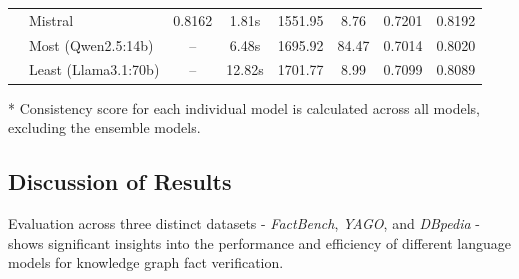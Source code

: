 \begin{table}[ht!]
{\begin{threeparttable}
\begin{tabular}{llcccc||cc}
                                            & Mistral                            & 0.8162                         & 1.81s                            & 1551.95                                       & 8.76             & 0.7201    & 0.8192   \\ \cline{2-8}
                                            & Most (Qwen2.5:14b)                 & --                             & 6.48s                            & 1695.92                                       & 84.47            & 0.7014    & 0.8020   \\
                                            & Least (Llama3.1:70b)               & --                             & 12.82s                           & 1701.77                                       & 8.99             & 0.7099    & 0.8089   \\
                \bottomrule
            \end{tabular}
            \begin{tablenotes}
                \item[*] Consistency score for each individual model is calculated across all models, excluding the ensemble models.
            \end{tablenotes}
        \end{threeparttable}}
    \label{tab:evaluation_results-full-wo-category-all-datasets}
\end{table}

\subsection{Discussion of Results}\label{subsec:discussion-of-results}
Evaluation across three distinct datasets - \textit{FactBench}, \textit{YAGO}, and \textit{DBpedia} - shows significant insights into the performance and efficiency of different language models for knowledge graph fact verification.


